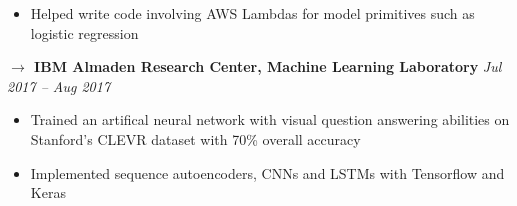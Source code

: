 \documentclass{res}
\begin{document}
\begin{resume}
\begin{itemize}
mization for Cirrus, a serverless machine learning framework
            \item Helped write code involving AWS Lambdas for model primitives such as logistic regression
        \end{itemize}
		\vspace{-10pt}
		{\bf $\rightarrow$ IBM Almaden Research Center, Machine Learning Laboratory} \hfill \emph{Jul 2017 -- Aug 2017} \\
        \vspace{-10pt}
        \begin{itemize}
            \item Trained an artifical neural network with visual question answering abilities on Stanford’s CLEVR
dataset with 70\% overall accuracy
            \item Implemented sequence autoencoders, CNNs and LSTMs with Tensorflow and Keras
        \end{itemize}
		\vspace{-10pt}

\end{resume}
\end{document}
